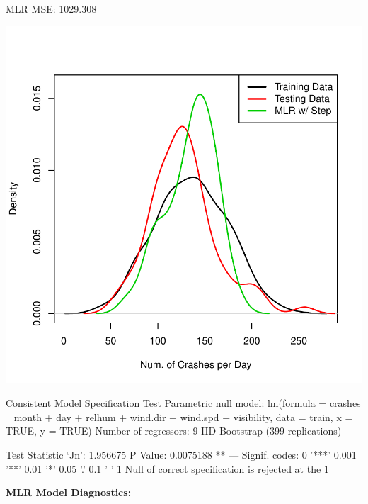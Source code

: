 \documentclass[11pt, a4paper]{article}
\begin{document}
\begin{Schunk}
\begin{Soutput}
MLR MSE: 1029.308
\end{Soutput}
\end{Schunk}
\includegraphics{regression-011}





\begin{Schunk}
\begin{Soutput}
Consistent Model Specification Test
Parametric null model: lm(formula = crashes ~ month + day + relhum + wind.dir +
                          wind.spd + visibility, data = train, x = TRUE, y =
                          TRUE)
Number of regressors: 9
IID Bootstrap (399 replications)

Test Statistic ‘Jn’: 1.956675	P Value: 0.0075188 **
---
Signif. codes:  0 '***' 0.001 '**' 0.01 '*' 0.05 '.' 0.1 ' ' 1
Null of correct specification is rejected at the 1%
\end{Soutput}
\end{Schunk}


\pagebreak
\noindent\textbf{MLR Model Diagnostics:}
\end{document}
